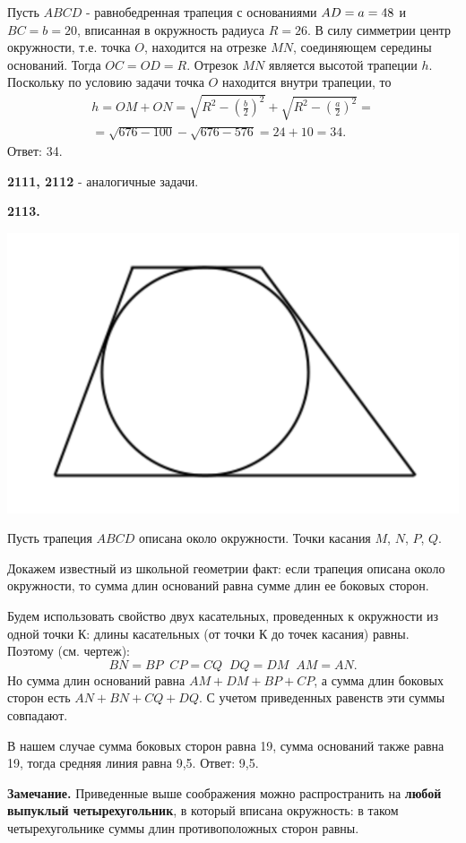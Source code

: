 Пусть $ABCD$ - равнобедренная трапеция с основаниями $\linebreak AD = a =48$ и $BC = b = 20$, вписанная в окружность радиуса $R=26$. В силу симметрии центр окружности, т.е. точка $O$, находится на отрезке $MN$, соединяющем середины оснований. Тогда $OC=OD=R$. Отрезок $MN$ является высотой трапеции $h$. Поскольку по условию задачи точка $O$ находится внутри трапеции, то
\begin{eqnarray*}
h=OM+ON=\sqrt{R^2- \left( \frac{b}{2} \right)^2} +\sqrt{R^2- \left( \frac{a}{2} \right)^2} =\\ =\sqrt{676-100} - \sqrt{676-576}=24+10=34.
\end{eqnarray*} \null \hspace*{\fill} Ответ: 34.

\textbf{2111, 2112} - аналогичные задачи.

\textbf{2113.}

{\centering \includegraphics[width=0.4\linewidth]{Geometry/Content/41.png}
	
}

 Пусть трапеция $ABCD$ описана около окружности. Точки касания $M$, $N$, $P$, $Q$. 
  
Докажем известный из школьной геометрии факт: если трапеция описана около окружности, то сумма длин оснований равна сумме длин ее боковых сторон.

Будем использовать свойство двух касательных, проведенных к окружности из одной точки $К$:   длины касательных (от точки $К$ до точек касания) равны. Поэтому (см. чертеж):
\[
BN=BP\;\;CP=CQ\;\;DQ=DM\;\;AM=AN.
\]
Но сумма длин оснований равна $AM+DM+BP+CP$, а сумма длин боковых сторон есть $AN+BN+CQ+DQ$. С учетом приведенных равенств эти суммы совпадают.

В нашем случае  сумма боковых сторон равна 19, сумма оснований также равна 19, тогда средняя линия равна 9,5. \newline \null \hspace*{\fill} Ответ: 9,5.

\textbf{Замечание.} Приведенные выше соображения можно распространить на \textbf{любой выпуклый четырехугольник}, в который вписана окружность: в таком четырехугольнике суммы длин противоположных сторон равны. 

